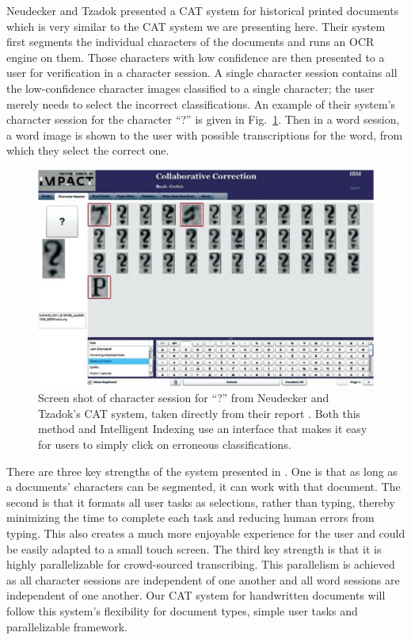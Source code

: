 \documentclass[conference]{IEEEtran}
\begin{document}
Neudecker and Tzadok\cite{Neudecker2010} presented a CAT system for historical printed documents which is very similar to the CAT system we are presenting here. Their system first segments the individual characters of the documents and runs an OCR engine on them. Those characters with low confidence are then presented to a user for verification in a character session. A single character session contains all the low-confidence character images classified to a single character; the user merely needs to select the incorrect classifications.
An example of their system's character session for the character ``?'' is given in Fig.~\ref{fig:carpet}. 
Then in a word session, a word image is shown to the user with possible transcriptions for the word, from which they select the correct one.

\begin{figure}
    \centering
    \includegraphics[width=.47\textwidth]{carpet}
    \caption{Screen shot of character session for ``?'' from Neudecker and Tzadok's CAT system, taken directly from their report \cite{Neudecker2010}. Both this method and Intelligent Indexing use an interface that makes it easy for users to simply click on erroneous classifications.}
    \label{fig:carpet}
\end{figure}

There are three key strengths of the system presented in \cite{Neudecker2010}. One is that as long as a documents' characters can be segmented, it can work with that document. The second is that it formats all user tasks as selections, rather than typing, thereby minimizing the time to complete each task and reducing human errors from typing. This also creates a much more enjoyable experience for the user and could be easily adapted to a small touch screen. The third key strength is that it is highly parallelizable for crowd-sourced transcribing. This parallelism is achieved as all character sessions are independent of one another and all word sessions are independent of one another. Our CAT system for handwritten documents will follow this system's flexibility for document types, simple user tasks and parallelizable framework.
\end{document}
